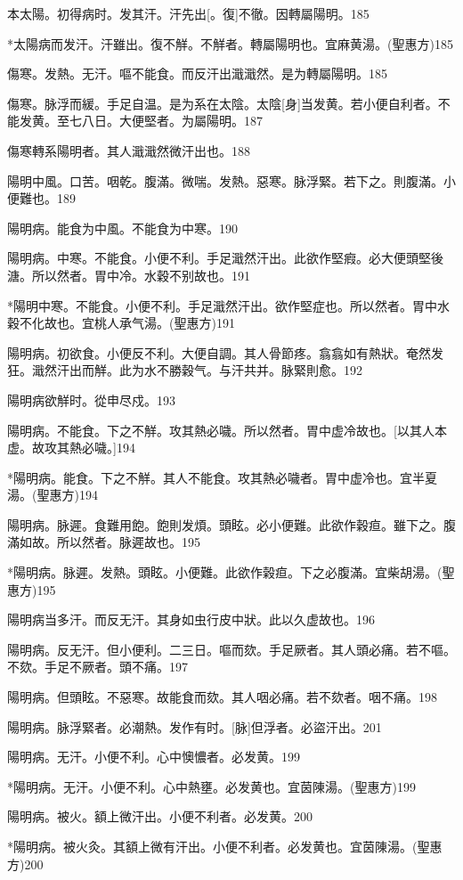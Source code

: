\documentclass[12pt,oneside,UTF8,b5paper]{ctexbook}她她她她她她她
\begin{document}
本太陽。初得病时。发其汗。汗先出[。復]不徹。因轉屬陽明。185

*太陽病而发汗。汗雖出。復不觧。不觧者。轉屬陽明也。宜麻黄湯。(聖惠方)185

傷寒。发熱。无汗。嘔不能食。而反汗出濈濈然。是为轉屬陽明。185

傷寒。脉浮而緩。手足自温。是为系在太陰。太陰[身]当发黄。若小便自利者。不能发黄。至七八日。大便堅者。为屬陽明。187

傷寒轉系陽明者。其人濈濈然微汗出也。188

陽明中風。口苦。咽乾。腹滿。微喘。发熱。惡寒。脉浮緊。若下之。則腹滿。小便難也。189

陽明病。能食为中風。不能食为中寒。190

陽明病。中寒。不能食。小便不利。手足濈然汗出。此欲作堅瘕。必大便頭堅後溏。所以然者。胃中冷。水穀不别故也。191

*陽明中寒。不能食。小便不利。手足濈然汗出。欲作堅症也。所以然者。胃中水穀不化故也。宜桃人承气湯。(聖惠方)191

陽明病。初欲食。小便反不利。大便自調。其人骨節疼。翕翕如有熱狀。奄然发狂。濈然汗出而觧。此为水不勝穀气。与汗共并。脉緊則愈。192

陽明病欲觧时。從申尽戍。193

陽明病。不能食。下之不觧。攻其熱必噦。所以然者。胃中虚冷故也。[以其人本虚。故攻其熱必噦。]194

*陽明病。能食。下之不觧。其人不能食。攻其熱必噦者。胃中虚冷也。宜半夏湯。(聖惠方)194

陽明病。脉遲。食難用飽。飽則发煩。頭眩。必小便難。此欲作穀疸。雖下之。腹滿如故。所以然者。脉遲故也。195

*陽明病。脉遲。发熱。頭眩。小便難。此欲作榖疸。下之必腹滿。宜柴胡湯。(聖惠方)195

陽明病当多汗。而反无汗。其身如虫行皮中狀。此以久虚故也。196

陽明病。反无汗。但小便利。二三日。嘔而欬。手足厥者。其人頭必痛。若不嘔。不欬。手足不厥者。頭不痛。197

陽明病。但頭眩。不惡寒。故能食而欬。其人咽必痛。若不欬者。咽不痛。198

陽明病。脉浮緊者。必潮熱。发作有时。[脉]但浮者。必盜汗出。201

陽明病。无汗。小便不利。心中懊憹者。必发黄。199

*陽明病。无汗。小便不利。心中熱壅。必发黄也。宜茵陳湯。(聖惠方)199

陽明病。被火。額上微汗出。小便不利者。必发黄。200

*陽明病。被火灸。其額上微有汗出。小便不利者。必发黄也。宜茵陳湯。(聖惠方)200
\end{document}
